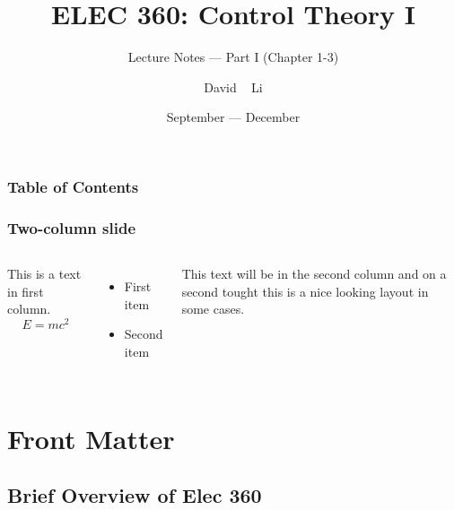 \documentclass{beamer}
\title[ELEC 360] %
{ELEC 360: Control Theory I}
\subtitle{Lecture Notes --- Part I (Chapter 1-3)\cite{textbook:ogata}}
\author[David Li] %
{David ~ Li\inst{1} }
\institute[Uvic] %
{
	\inst{1}%
	Faculty of Engineering\\
	University of Victoria \\
	Third Year Engineering Student \\
	Computer Engineering 3B
}
\date[Fall Term 3B (2017)] %
{September --- December}
\begin{document}
\frame{\titlepage}


\begin{frame}
\frametitle{Table of Contents}
\tableofcontents
\end{frame}




\begin{frame}
\frametitle{Two-column slide}

\begin{columns}

This is a text in first column.
$$E=mc^2$$
\begin{itemize}
\item First item
\item Second item
\end{itemize}

This text will be in the second column
and on a second tought this is a nice looking
layout in some cases.
\end{columns}

\end{frame}

\section{Front Matter}
\subsection{Brief Overview of Elec 360}
\end{document}
